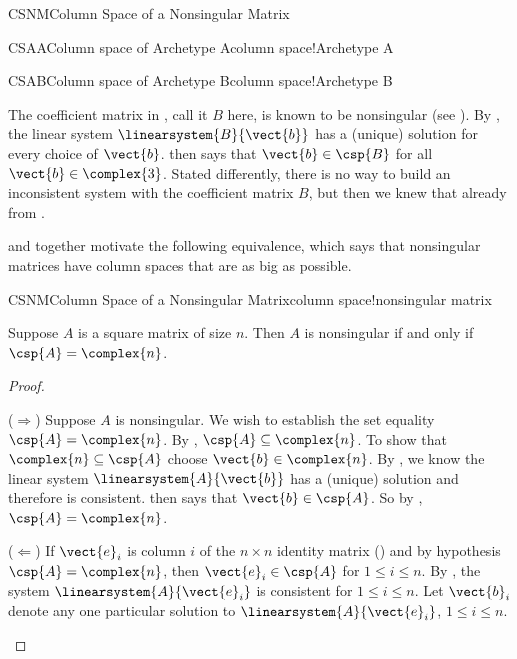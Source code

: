 \begin{subsect}{CSNM}{Column Space of a Nonsingular Matrix}
\begin{example}{CSAA}{Column space of Archetype A}{column space!Archetype A}
%
\end{example}
%
\begin{example}{CSAB}{Column space of Archetype B}{column space!Archetype B}
%
\begin{para}The coefficient matrix in , call it $B$ here,  is known to be nonsingular (see ).  By , the linear system $\linearsystem{B}{\vect{b}}$ has a (unique) solution for every choice of $\vect{b}$.   then says that $\vect{b}\in\csp{B}$ for all $\vect{b}\in\complex{3}$.  Stated differently, there is no way to build an inconsistent system with the coefficient matrix $B$, but then we knew that already from .\end{para}
%
\end{example}
%
\begin{para} and  together motivate the following equivalence, which says that nonsingular matrices have column spaces that are as big as possible.\end{para}
%
\begin{theorem}{CSNM}{Column Space of a Nonsingular Matrix}{column space!nonsingular matrix}
%
\begin{para}Suppose $A$ is a square matrix of size $n$.  Then $A$ is nonsingular if and only if $\csp{A}=\complex{n}$.\end{para}
\end{theorem}
%
\begin{proof}
\begin{para}($\Rightarrow$)  Suppose $A$ is nonsingular.  We wish to establish the set equality $\csp{A}=\complex{n}$.  By , $\csp{A}\subseteq\complex{n}$.
%
To show that  $\complex{n}\subseteq\csp{A}$ choose $\vect{b}\in\complex{n}$.  By , we know the linear system $\linearsystem{A}{\vect{b}}$ has a (unique) solution and therefore is consistent.   then says that $\vect{b}\in\csp{A}$.  So  by , $\csp{A}=\complex{n}$.\end{para}
%
\begin{para}($\Leftarrow$)  If $\vect{e}_i$ is column $i$ of the $n\times n$ identity matrix () and by hypothesis $\csp{A}=\complex{n}$, then $\vect{e}_i\in\csp{A}$ for $1\leq i\leq n$.  By , the system $\linearsystem{A}{\vect{e}_i}$ is consistent for $1\leq i\leq n$.   Let $\vect{b}_i$ denote any one particular solution to $\linearsystem{A}{\vect{e}_i}$, $1\leq i\leq n$.\end{para}

\end{proof}
\end{subsect}
